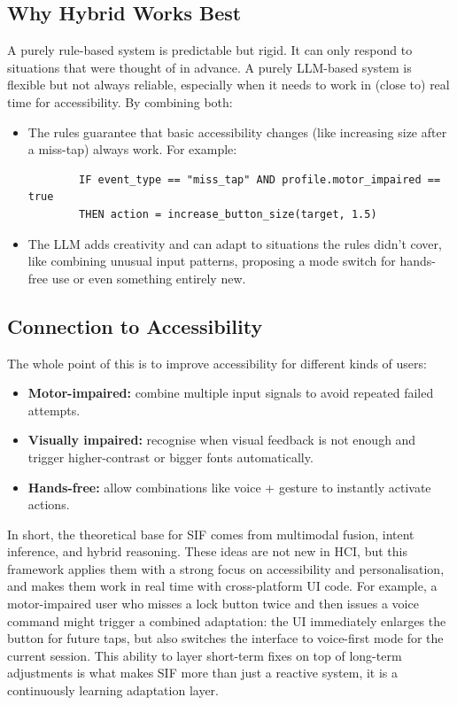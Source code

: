 \documentclass[openany]{book}
\begin{document}
\subsection{Why Hybrid Works Best}
A purely rule-based system is predictable but rigid. It can only respond to situations that were thought of in advance. A purely LLM-based system is flexible but not always reliable, especially when it needs to work in (close to) real time for accessibility.
By combining both:
\begin{itemize}
    \item The rules guarantee that basic accessibility changes (like increasing size after a miss-tap) always work. For example:
    \begin{verbatim}
        IF event_type == "miss_tap" AND profile.motor_impaired == true
        THEN action = increase_button_size(target, 1.5)
    \end{verbatim}
    \item The LLM adds creativity and can adapt to situations the rules didn’t cover, like combining unusual input patterns, proposing a mode switch for hands-free use or even something entirely new.
\end{itemize}

\subsection{Connection to Accessibility}
The whole point of this is to improve accessibility for different kinds of users:
\begin{itemize}
    \item \textbf{Motor-impaired:} combine multiple input signals to avoid repeated failed attempts.
    \item \textbf{Visually impaired:} recognise when visual feedback is not enough and trigger higher-contrast or bigger fonts automatically.
    \item \textbf{Hands-free:} allow combinations like voice + gesture to instantly activate actions.
\end{itemize}

In short, the theoretical base for SIF comes from multimodal fusion, intent inference, and hybrid reasoning. These ideas are not new in HCI, but this framework applies them with a strong focus on accessibility and personalisation, and makes them work in real time with cross-platform UI code. For example, a motor-impaired user who misses a lock button twice and then issues a voice command might trigger a combined adaptation: the UI immediately enlarges the button for future taps, but also switches the interface to voice-first mode for the current session. This ability to layer short-term fixes on top of long-term adjustments is what makes SIF more than just a reactive system, it is a continuously learning adaptation layer.
\end{document}
